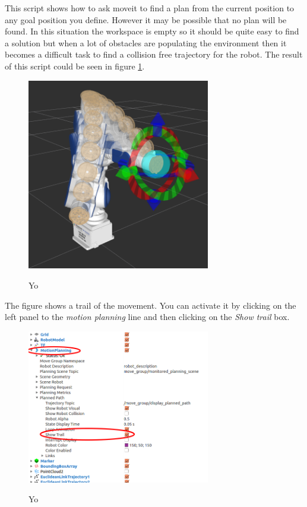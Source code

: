 This script shows how to ask moveit to find a plan from the current position to any goal position you define. However it may be possible that no plan will be found. In this situation the workspace is empty so it should be quite easy to find a solution but when a lot of obstacles are populating the environment then it becomes a difficult task to find a collision free trajectory for the robot. The result of this script could be seen in figure \ref{fig:simple_moving}.

\begin{figure}
\includegraphics[width=8cm]{images/utilisation/simple_moving.png}
\centering
\label{fig:simple_moving}
\caption{Yo}
\end{figure}

The figure shows a trail of the movement. You can activate it by clicking on the left panel to the \emph{motion planning} line and then clicking on the \emph{Show trail} box.  


\begin{figure}
\includegraphics[width=8cm]{images/utilisation/show_trail.png}
\centering
\label{fig:show_trail}
\caption{Yo}
\end{figure}